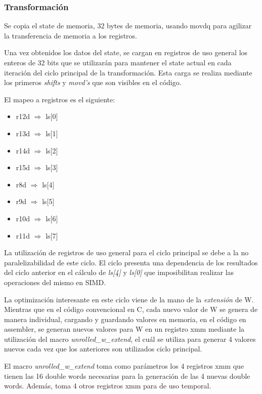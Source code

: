 \documentclass[a4paper, 10pt, twoside]{article}
\begin{document}
\subsubsection{Transformación} \label{transform_asm}

Se copia el state de memoria, 32 bytes de memoria, usando movdq para agilizar la transferencia de memoria a los registros.

Una vez obtenidos los datos del state, se cargan en registros de uso general los enteros de 32 bits que se utilizarán para 
mantener el state actual en cada iteración del ciclo principal de la transformación. Esta carga se realiza mediante los primeros 
\textit{shifts} y \textit{movd's} que son visibles en el código.

El mapeo a registros es el siguiente:
\begin{itemize}
	\item r12d $\Rightarrow$ ls[0]
	\item r13d $\Rightarrow$ ls[1]
	\item r14d $\Rightarrow$ ls[2]
	\item r15d $\Rightarrow$ ls[3]
	\item r8d $\Rightarrow$ ls[4]
	\item r9d $\Rightarrow$ ls[5]
	\item r10d $\Rightarrow$ ls[6]
	\item r11d $\Rightarrow$ ls[7]
\end{itemize}

La utilización de registros de uso general para el ciclo principal se debe a la no paralelizabilidad de este ciclo. El ciclo 
presenta una dependencia de los resultados del ciclo anterior en el cálculo de \textit{ls[4]} y \textit{ls[0]} que imposibilitan 
realizar las operaciones del mismo en SIMD.

La optimización interesante en este ciclo viene de la mano de la \textit{extensión} de W. Mientras que en el código convencional en C, cada nuevo valor de W se genera de manera individual, cargando y guardando valores en memoria, en el código en assembler, se generan nuevos valores para W en un registro xmm mediante la utilización del macro \textit{unrolled\_w\_extend}, el cuál se utiliza para generar 4 valores nuevos cada vez que los anteriores son utilizados ciclo principal.

El macro \textit{unrolled\_w\_extend} toma como parámetros los 4 registros xmm que tienen las 16 double words necesarias para la generación de las 4 nuevas double words. Además, toma 4 otros registros xmm para de uso temporal.
\end{document}
